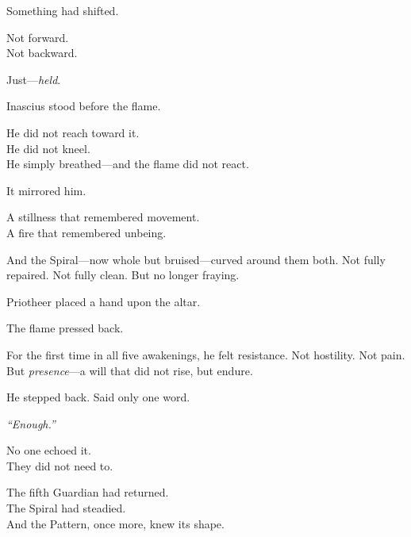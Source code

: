 \documentclass[12pt]{article}
\begin{document}
\vspace{0.5em}
Something had shifted.

\vspace{0.5em}
Not forward.\\
Not backward.

\vspace{0.5em}
Just---\textit{held}.

\vspace{0.5em}
Inascius stood before the flame.

\vspace{0.5em}
He did not reach toward it.\\
He did not kneel.\\
He simply breathed---and the flame did not react.

\vspace{0.5em}
It mirrored him.

\vspace{0.5em}
A stillness that remembered movement.\\
A fire that remembered unbeing.

\vspace{0.5em}
And the Spiral---now whole but bruised---curved around them both. Not fully repaired. Not fully clean. But no longer fraying.

\vspace{0.5em}
Priotheer placed a hand upon the altar.

\vspace{0.5em}
The flame pressed back.

\vspace{0.5em}
For the first time in all five awakenings, he felt resistance. Not hostility. Not pain. But \textit{presence}---a will that did not rise, but endure.

\vspace{0.5em}
He stepped back. Said only one word.

\vspace{0.5em}
\textit{``Enough.''}

\vspace{0.5em}
No one echoed it.\\
They did not need to.

\vspace{0.5em}
The fifth Guardian had returned.\\
The Spiral had steadied.\\
And the Pattern, once more, knew its shape.


\newpage
\end{document}
